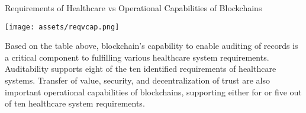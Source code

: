 \documentclass[12pt]{report}
\begin{document}
\begin{comment}
\begin{table}[!h]
\centering
\caption{Requirements of Healthcare vs Operational Capabilities of Blockchains}
\label{table:reqvcap}
\resizebox{\textwidth}{!}{%
\begin{tabular}{|l|l|l|l|l|l|}
 \hline
  \textbf{Requirements/Capabilties} & \textbf{Auditability} & \textbf{Transfer of Value} & \textbf{Security} & \textbf{Decentralization of Trust} & \textbf{Requirement Total} \\ 
 \hline
 \textbf{Cost Reduction} & 1 & 1 & 1 & 1 & 4\\
 \hline
 \textbf{Fraud Prevention} & 1 & 0 & 1 & 1 & 3\\
 \hline
 \textbf{Identity Management} & 0 & 0 & 1 & 1 & 2\\
 \hline
 \textbf{Record Availability} & 1 & 1 & 0 & 0 & 2\\
 \hline
 \textbf{HIPAA Compliance} & 1 & 0 & 1 & 0 & 2\\
 \hline
 \textbf{Universality of Record} & 1 & 0 & 0 & 1 & 2\\
 \hline
 \textbf{Auditability} & 1 & 1 & 0 & 0 & 2\\
 \hline
 \textbf{Reconciliation} & 1 & 0 & 0 & 0 & 1\\
 \hline
 \textbf{Interoperability} & 1 & 0 & 0 & 0 & 1\\
 \hline
 \textbf{Encourage Patient Engagement} & 0 & 1 & 0 & 0 & 1\\
 \hline
 \textbf{Capability Total} & 9 & 5 & 4 & 4 & .\\
 \hline
\end{tabular}%
}
\end{table}
\end{comment}

\begin{table}[h]
\begin{center}
\caption{Requirements of Healthcare vs Operational Capabilities of Blockchains}
\texttt{[image: assets/reqvcap.png]}
\label{table:reqvcap}
\end{center}
\end{table}

Based on the table above, blockchain's capability to enable auditing of records is a critical component to fulfilling various healthcare system requirements. Auditability supports eight of the ten identified requirements of healthcare systems. Transfer of value, security, and decentralization of trust are also important operational capabilities of blockchains, supporting either for or five out of ten healthcare system requirements.
\end{document}
